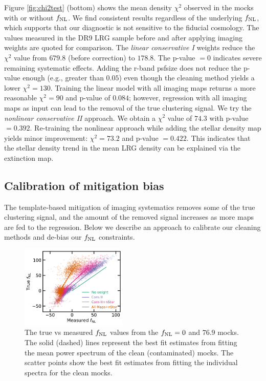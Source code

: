 Figure \ref{fig:chi2test} (bottom) shows the mean density $\chi^{2}$ observed in the mocks with or without $f_{\rm NL}$. We find consistent results regardless of the underlying $f_{\rm NL}$, which supports that our diagnostic is not sensitive to the fiducial cosmology. The values measured in the DR9 LRG sample before and after applying imaging weights are quoted for comparison. The \textit{linear conservative I} weights reduce the $\chi^{2}$ value from $679.8$ (before correction) to $178.8$. The p-value $=0$ indicates severe remaining systematic effects. Adding the r-band psfsize does not reduce the p-value enough (e.g., greater than $0.05$) even though the cleaning method yields a lower $\chi^{2}=130$. Training the linear model with all imaging maps returns a more reasonable $\chi^{2}=90$ and p-value of $0.084$; however, regression with all imaging maps as input can lead to the removal of the true clustering signal. We try the \textit{nonlinear conservative II} approach. We obtain a $\chi^{2}$ value of $74.3$ with p-value $=0.392$. Re-training the nonlinear approach while adding the stellar density map yields minor improvement: $\chi^{2}=73.2$ and p-value $=0.422$.  This indicates that the stellar density trend in the mean LRG density can be explained via the extinction map.


\subsection{Calibration of mitigation bias}\label{ssec:calibration}
The template-based mitigation of imaging systematics removes some of the true clustering signal, and the amount of the removed signal increases as more maps are fed to the regression. Below we describe an approach to calibrate our cleaning methods and de-bias our $f_{\rm NL}$ constraints. 

\begin{figure}
\centering
\includegraphics[width=0.45\textwidth]{figures/fnlbias}
\caption{The true vs measured $f_{\rm NL}$ values from the $f_{\rm NL}=0$ and $76.9$ mocks. The solid (dashed) lines represent the best fit estimates from fitting the mean power spectrum of the clean (contaminated) mocks. The scatter points show the best fit estimates from fitting the individual spectra for the clean mocks.}\label{fig:fnlbias}
\end{figure}

